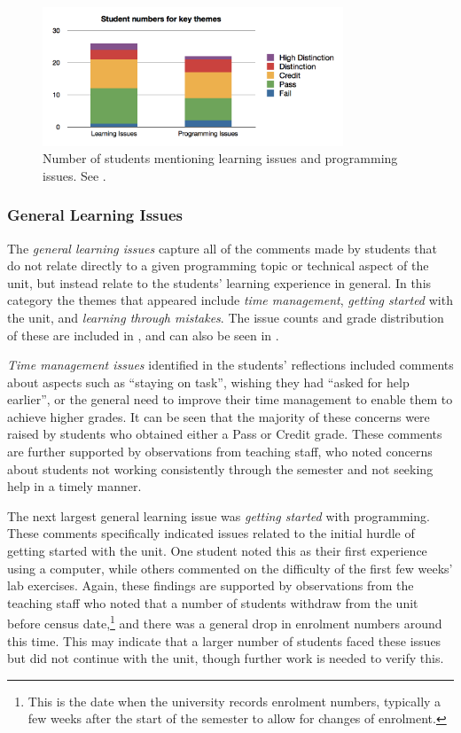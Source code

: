 \begin{figure}[thbp]
	\centering
	\includegraphics[width=0.8\textwidth]{NumStudentsMentioningIssues}
	\caption{Number of students mentioning learning issues and programming issues.  See .}
	\label{fig:student_numbers}
\end{figure}


\subsubsection{General Learning Issues} %
\label{sub:general_learning_issues}

The \emph{general learning issues} capture all of the comments made by students that do not relate directly to a given programming topic or technical aspect of the unit, but instead relate to the students' learning experience in general. In this category the themes that appeared include  \emph{time management},  \emph{getting started} with the unit, and \emph{learning through mistakes}. The issue counts and grade distribution of these are included in , and can also be seen in .

\emph{Time management issues} identified in the students' reflections included comments about aspects such as ``staying on task'', wishing they had ``asked for help earlier'', or the general need to improve their time management to enable them to achieve higher grades. It can be seen that the majority of these concerns were raised by students who obtained either a Pass or Credit grade. These comments are further supported by observations from teaching staff, who noted concerns about students not working consistently through the semester and not seeking help in a timely manner.

The next largest general learning issue was \emph{getting started} with programming. These comments specifically indicated issues related to the initial hurdle of getting started with the unit. One student noted this as their first experience using a computer, while others commented on the difficulty of the first few weeks' lab exercises. Again, these findings are supported by observations from the teaching staff who noted that a number of students withdraw from the unit before census date,\footnote{This is the date when the university records enrolment numbers, typically a few weeks after the start of the semester to allow for changes of enrolment.} and there was a general drop in enrolment numbers around this time. This may indicate that a larger number of students faced these issues but did not continue with the unit, though further work is needed to verify this.

